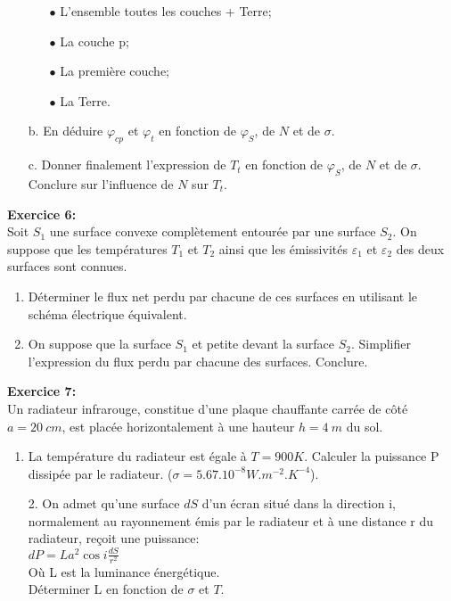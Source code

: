 \documentclass{article}
\begin{document}
\begin{enumerate}
\begin{enumerate}
\item[$\bullet$] L'ensemble {toutes les couches + Terre};
\item[$\bullet$] La couche p;
\item[$\bullet$] La première couche;
\item[$\bullet$] La Terre.
\end{enumerate}
\item[b.] En déduire $\varphi_{cp}$ et $\varphi_{t}$ en fonction de $\varphi_{S}$, de $N$ et de $\sigma$.
\item[c.] Donner finalement l'expression de $T_{t}$ en fonction de $\varphi_{S}$, de $N$ et de $\sigma$. Conclure sur l'influence de $N$ sur $T_{t}$.
\end{enumerate}
\textbf{Exercice 6:}\\
Soit $S_{1}$ une surface convexe complètement entourée par une surface $S_{2}$. On suppose que les températures $T_{1}$ et $T_{2}$ ainsi que les émissivités $\varepsilon_{1}$ et $\varepsilon_{2}$ des deux surfaces sont connues.
\begin{enumerate}
\item Déterminer le flux net perdu par chacune de ces surfaces en utilisant le schéma électrique équivalent.
\item On suppose que la surface $S_{1}$ et petite devant la surface $S_{2}$. Simplifier l'expression du flux perdu par chacune des surfaces. Conclure.
\end{enumerate}
\textbf{Exercice 7:}\\
Un radiateur infrarouge, constitue d'une plaque chauffante carrée de c\^oté  $a=20~cm$, est placée horizontalement à une hauteur $h=4~m$ du sol.\\
\begin{enumerate}
\item La température du radiateur est égale à $T=900K$. Calculer la puissance P dissipée par le radiateur. ($\sigma=5.67.10^{-8}W.m^{-2}.K^{-4}$).
\end{enumerate}
\begin{minipage}{.65\textwidth}%
\vspace*{0.4cm}
\begin{enumerate}
\item[2.] On admet qu'une surface $dS$ d'un écran situé dans la direction i, normalement au rayonnement émis par le radiateur et à une distance r du radiateur, reçoit une puissance:\\
$dP=La^{2}\cos i \frac{dS}{r^{2}}$\\
Où L est la luminance énergétique.\\
Déterminer L en fonction de $\sigma$ et $T$.
\end{enumerate}
\end{minipage}%
\end{document}
